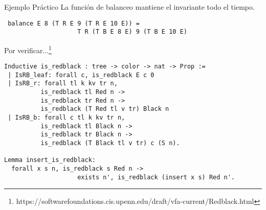 \documentclass[xcolor=dvipsnames,table,handout]{beamer}
\begin{document}
\begin{frame}[fragile]{Ejemplo Práctico}
La función de balanceo mantiene el invariante todo el tiempo.

\centering
\begin{lstlisting}
 balance E 8 (T R E 9 (T R E 10 E)) =
                    T R (T B E 8 E) 9 (T B E 10 E)
\end{lstlisting}

\end{frame}


\begin{frame}[fragile]{Por verificar...\footnote[frame]{https://softwarefoundations.cis.upenn.edu/draft/vfa-current/Redblack.html}}
    \begin{lstlisting}[language=coq]
Inductive is_redblack : tree -> color -> nat -> Prop :=
 | IsRB_leaf: forall c, is_redblack E c 0
 | IsRB_r: forall tl k kv tr n,
          is_redblack tl Red n ->
          is_redblack tr Red n ->
          is_redblack (T Red tl v tr) Black n
 | IsRB_b: forall c tl k kv tr n,
          is_redblack tl Black n ->
          is_redblack tr Black n ->
          is_redblack (T Black tl v tr) c (S n).

Lemma insert_is_redblack:
  forall x s n, is_redblack s Red n ->
                    exists n', is_redblack (insert x s) Red n'.
    \end{lstlisting}

\end{frame}
\end{document}
